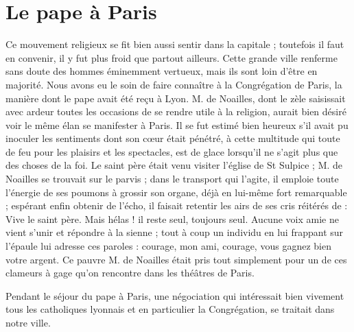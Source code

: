 \section*{Le pape à Paris}
Ce mouvement religieux se fit bien aussi sentir dans la capitale ; toutefois il faut en convenir, il y fut plus froid que partout ailleurs. Cette grande ville renferme sans doute des hommes éminemment vertueux, mais ils sont loin d'être en majorité. Nous avons eu le soin de faire connaître à la Congrégation de Paris, la manière dont le pape avait été reçu à Lyon. M. de Noailles, dont le zèle saisissait avec ardeur toutes les occasions de se rendre utile à la religion, aurait bien désiré voir le même élan se manifester à Paris. Il se fut estimé bien heureux s'il avait pu inoculer les sentiments dont son cœur était pénétré, à cette multitude qui toute de feu pour les plaisirs et les spectacles, est de glace lorsqu'il ne s'agit plus que des choses de la foi. Le saint père était venu visiter l'église de St Sulpice ; M. de Noailles se trouvait sur le parvis ; dans le transport qui l'agite, il emploie toute l'énergie de ses poumons à grossir son organe, déjà en lui-même fort remarquable ; espérant enfin obtenir de l'écho, il faisait retentir les airs de ses cris réitérés de : Vive le saint père. Mais hélas ! il reste seul, toujours seul. Aucune voix amie ne vient s'unir et répondre à la sienne ; tout à coup un individu en lui frappant sur l'épaule lui adresse ces paroles : courage, mon ami, courage, vous gagnez bien votre argent. Ce pauvre M. de Noailles était pris tout simplement pour un de ces clameurs à gage qu'on rencontre dans les théâtres de Paris.

Pendant le séjour du pape à Paris, une négociation qui
intéressait bien vivement tous les catholiques lyonnais et en particulier la Congrégation, se traitait dans notre ville.

